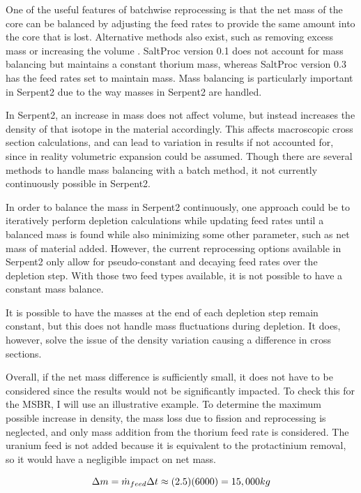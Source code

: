 One of the useful features of batchwise reprocessing is that the net mass of the core can be balanced by adjusting the feed rates to provide the same amount into the core that is lost. Alternative methods also exist, such as removing excess mass or increasing the volume \cite{ridley_method_2017}. SaltProc version 0.1 does not account for mass balancing but maintains a constant thorium mass, whereas SaltProc version 0.3 has the feed rates set to maintain mass. Mass balancing is particularly important in Serpent2 due to the way masses in Serpent2 are handled.

In Serpent2, an increase in mass does not affect volume, but instead increases the density of that isotope in the material accordingly. This affects macroscopic cross section calculations, and can lead to variation in results if not accounted for, since in reality volumetric expansion could be assumed. Though there are several methods to handle mass balancing with a batch method, it not currently continuously possible in Serpent2.

In order to balance the mass in Serpent2 continuously, one approach could be to iteratively perform depletion calculations while updating feed rates until a balanced mass is found while also minimizing some other parameter, such as net mass of material added. However, the current reprocessing options available in Serpent2 only allow for pseudo-constant and decaying feed rates over the depletion step. With those two feed types available, it is not possible to have a constant mass balance.

It is possible to have the masses at the end of each depletion step remain constant, but this does not handle mass fluctuations during depletion. It does, however, solve the issue of the density variation causing a difference in cross sections.

Overall, if the net mass difference is sufficiently small, it does not have to be considered since the results would not be significantly impacted. To check this for the MSBR, I will use an illustrative example. To determine the maximum possible increase in density, the mass loss due to fission and reprocessing is neglected, and only mass addition from the thorium feed rate is considered. The uranium feed is not added because it is equivalent to the protactinium removal, so it would have a negligible impact on net mass. 

\begin{equation} \hfill
\Delta m = \Dot{m}_{feed} \Delta t \approx (2.5)(6000) = 15,000 kg
\hfill\label{eq:m_gain} \end{equation}

